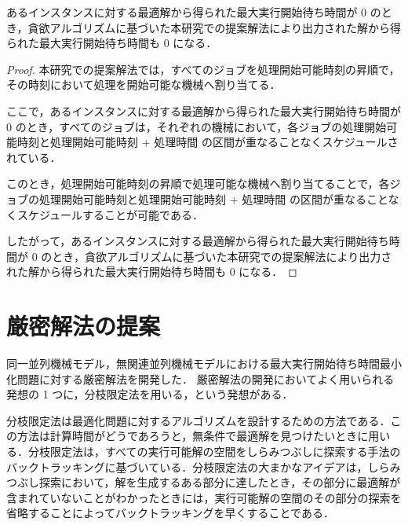\documentclass[12pt]{optlab-bachelor}
\begin{document}
\begin{lemma}
  あるインスタンスに対する最適解から得られた最大実行開始待ち時間が $0$ のとき，貪欲アルゴリズムに基づいた本研究での提案解法により出力された解から得られた最大実行開始待ち時間も $0$ になる．
\end{lemma}

\begin{proof}
  本研究での提案解法では，すべてのジョブを処理開始可能時刻の昇順で，その時刻において処理を開始可能な機械へ割り当てる．

  ここで，あるインスタンスに対する最適解から得られた最大実行開始待ち時間が 0 のとき，すべてのジョブは，それぞれの機械において，各ジョブの処理開始可能時刻と処理開始可能時刻 + 処理時間 の区間が重なることなくスケジュールされている．

  このとき，処理開始可能時刻の昇順で処理可能な機械へ割り当てることで，各ジョブの処理開始可能時刻と処理開始可能時刻 + 処理時間 の区間が重なることなくスケジュールすることが可能である．

  したがって，あるインスタンスに対する最適解から得られた最大実行開始待ち時間が 0 のとき，貪欲アルゴリズムに基づいた本研究での提案解法により出力された解から得られた最大実行開始待ち時間も 0 になる．
\end{proof}

\section{厳密解法の提案}\label{5_s_2}
同一並列機械モデル，無関連並列機械モデルにおける最大実行開始待ち時間最小化問題に対する厳密解法を開発した．
厳密解法の開発においてよく用いられる発想の 1 つに，分枝限定法を用いる，という発想がある．

分枝限定法は最適化問題に対するアルゴリズムを設計するための方法である．この方法は計算時間がどうであろうと，無条件で最適解を見つけたいときに用いる．分枝限定法は，すべての実行可能解の空間をしらみつぶしに探索する手法のバックトラッキングに基づいている．分枝限定法の大まかなアイデアは，しらみつぶし探索において，解を生成するある部分に達したとき，その部分に最適解が含まれていないことがわかったときには，実行可能解の空間のその部分の探索を省略することによってバックトラッキングを早くすることである．
\end{document}
